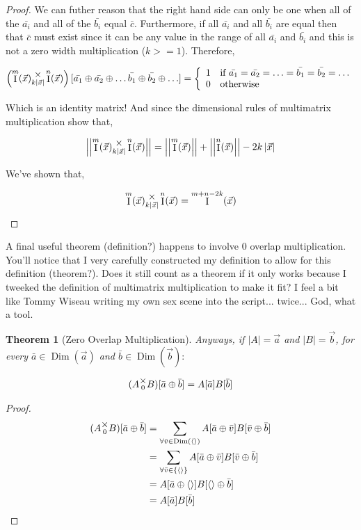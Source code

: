 \documentclass[12pt]{book}
\theoremstyle{plain}
\newtheorem{theorem}{Theorem}[chapter]
\theoremstyle{definition}
\theoremstyle{ppart}
\theoremstyle{case}
\theoremstyle{solution}
\DeclareMathOperator{\Dim}{Dim}
\DeclareMathOperator{\Ident}{I}
\newcommand{\mmult}[1]{\text{\raisebox{1ex}{$\underset{#1}{\times}$}}}
\newcommand{\shape}[1]{\left|#1\right|}
\begin{document}
\begin{landscape}
\begin{proof}
We can futher reason that the right hand side can only be one when all of the
$\bar{a_i}$ and all of the $\bar{b_i}$ equal $\bar{c}$. Furthermore, if all
$\bar{a_i}$ and all $\bar{b_i}$ are equal then that $\bar{c}$ must exist since it can
be any value in the range of all $\bar{a_i}$ and $\bar{b_i}$ and this is not a
zero width multiplication ($k >= 1$). Therefore,

\begin{align*}
\left( \Ident^m(\vec{x}) \mmult{k\shape{\vec{x}}} \Ident^n(\vec{x}) \right)
[\bar{a_1} \oplus \bar{a_2} \oplus \ldots \bar{b_1} \oplus \bar{b_2} \oplus \ldots] =
\left\{
  \begin{array}{ll}
    1 & \mbox{if } \bar{a_1} = \bar{a_2} = \ldots = \bar{b_1} = \bar{b_2} = \ldots \\
    0 & \mbox{otherwise}
  \end{array}
\right.
\end{align*} 

Which is an identity matrix! And since the dimensional rules of multimatrix 
multiplication show that,

\[
 \shape{\shape{ \Ident^m(\vec{x}) \mmult{k\shape{\vec{x}}} \Ident^n(\vec{x}) }}
 =
 \shape{\shape{\Ident^m(\vec{x})}} + \shape{\shape{\Ident^n(\vec{x})}} - 2k\shape{\vec{x}}
\]

We've shown that,

\[ \Ident^m(\vec{x}) \mmult{k\shape{\vec{x}}} \Ident^n(\vec{x}) = \Ident^{m+n-2k}(\vec{x}) \]
\end{proof}
\end{landscape}

A final useful theorem (definition?) happens to involve 0 overlap multiplication.
You'll notice that I very carefully constructed my definition to allow for this
definition (theorem?). Does it still count as a theorem if it only works because
I tweeked the definition of multimatrix multiplication to make it fit? I feel
a bit like Tommy Wiseau writing my own sex scene into the script... twice... God,
what a tool.

\begin{theorem}[Zero Overlap Multiplication]
Anyways, if $\shape{A} = \vec{a}$ and $\shape{B} = \vec{b}$, for every $\bar{a} \in \Dim(\vec{a})$
and $\bar{b} \in \Dim(\vec{b}):$

\[ (A \mmult{0} B)[\bar{a} \oplus \bar{b}] = A[\bar{a}] B[\bar{b}] \]

\end{theorem}
\begin{proof}
\begin{align*}
	(A \mmult{0} B)[\bar{a} \oplus \bar{b}]
	&=
	\sum_{\forall \bar{v} \in \Dim(\left<\right>)}
	A[\bar{a} \oplus \bar{v}] B[\bar{v} \oplus \bar{b}] \\
	&=
	\sum_{\forall \bar{v} \in \left\{\left<\right>\right\}}
	A[\bar{a} \oplus \bar{v}] B[\bar{v} \oplus \bar{b}] \\
	&=
	A[\bar{a} \oplus \left<\right>] B[\left<\right> \oplus \bar{b}] \\
	&=
	A[\bar{a}] B[\bar{b}] \\
\end{align*}
\end{proof}
\end{document}
